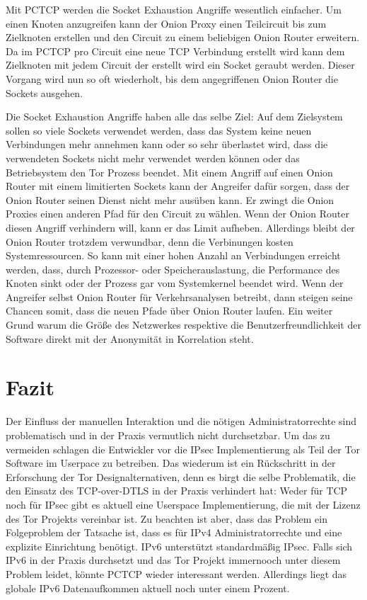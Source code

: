 \documentclass[fleqn,envcountsame,runningheads,10pt,a4paper]{llncs}
\begin{document}
Mit PCTCP werden die Socket Exhaustion Angriffe wesentlich einfacher. Um einen Knoten anzugreifen kann der Onion Proxy einen Teilcircuit bis zum Zielknoten erstellen und den Circuit zu einem beliebigen Onion Router erweitern. Da im PCTCP pro Circuit eine neue TCP Verbindung erstellt wird kann dem Zielknoten mit jedem Circuit der erstellt wird ein Socket geraubt werden. Dieser Vorgang wird nun so oft wiederholt, bis dem angegriffenen Onion Router die Sockets ausgehen.

Die Socket Exhaustion Angriffe haben alle das selbe Ziel: Auf dem Zielsystem sollen so viele Sockets verwendet werden, dass das System keine neuen Verbindungen mehr annehmen kann oder so sehr überlastet wird, dass die verwendeten Sockets nicht mehr verwendet werden können oder das Betriebsystem den Tor Prozess beendet. Mit einem Angriff auf einen Onion Router mit einem limitierten Sockets kann der Angreifer dafür sorgen, dass der Onion Router seinen Dienst nicht mehr ausüben kann. Er zwingt die Onion Proxies einen anderen Pfad für den Circuit zu wählen. Wenn der Onion Router diesen Angriff verhindern will, kann er das Limit aufheben. Allerdings bleibt der Onion Router trotzdem verwundbar, denn die Verbinungen kosten  Systemressourcen. So kann mit einer hohen Anzahl an Verbindungen erreicht werden, dass, durch Prozessor- oder Speicherauslastung, die Performance des Knoten sinkt oder der Prozess gar vom Systemkernel beendet wird. Wenn der Angreifer selbst Onion Router für Verkehrsanalysen betreibt, dann steigen seine Chancen somit, dass die neuen Pfade über Onion Router laufen. Ein weiter Grund warum die Größe des Netzwerkes respektive die Benutzerfreundlichkeit der Software direkt mit der Anonymität in Korrelation steht.

\section{Fazit}

Der Einfluss der manuellen Interaktion und die nötigen Administratorrechte sind problematisch und in der Praxis vermutlich nicht durchsetzbar. Um das zu vermeiden schlagen die Entwickler vor die IPsec Implementierung als Teil der Tor Software im Userpace zu betreiben. Das wiederum ist ein Rückschritt in der Erforschung der Tor Designalternativen, denn es birgt die selbe Problematik, die den Einsatz des TCP-over-DTLS in der Praxis verhindert hat: Weder für TCP noch für IPsec gibt es aktuell eine Userspace Implementierung, die mit der Lizenz des Tor Projekts vereinbar ist. Zu beachten ist aber, dass das Problem ein Folgeproblem der Tatsache ist, dass es für IPv4 Administratorrechte und eine explizite Einrichtung benötigt. IPv6 unterstützt standardmäßig IPsec. Falls sich IPv6 in der Praxis durchsetzt und das Tor Projekt immernooch unter diesem Problem leidet, könnte PCTCP wieder interessant werden. Allerdings liegt das globale IPv6 Datenaufkommen aktuell noch unter einem Prozent.
\end{document}
